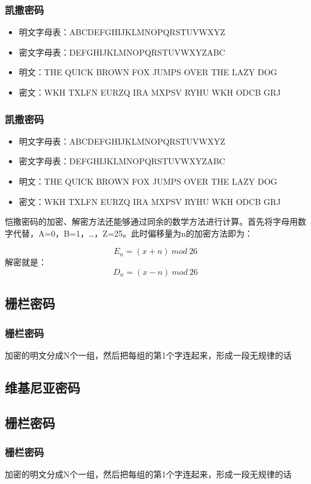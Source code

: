 \documentclass[slidestop,compress,mathserif]{beamer}
\begin{document}
\begin{frame}
  \frametitle{凯撒密码}
  \begin{itemize}[<+->]
    \item{明文字母表：}ABCDEFGHIJKLMNOPQRSTUVWXYZ
    \item{密文字母表：}DEFGHIJKLMNOPQRSTUVWXYZABC
    \item{明文：}THE QUICK BROWN FOX JUMPS OVER THE LAZY DOG
    \item{密文：}WKH TXLFN EURZQ IRA MXPSV RYHU WKH ODCB GRJ
    \end{itemize}

\end{frame}
\begin{frame}
  \frametitle{凯撒密码}
  \begin{itemize}
    \item{明文字母表：}ABCDEFGHIJKLMNOPQRSTUVWXYZ
    \item{密文字母表：}DEFGHIJKLMNOPQRSTUVWXYZABC
    \item{明文：}THE QUICK BROWN FOX JUMPS OVER THE LAZY DOG
    \item{密文：}WKH TXLFN EURZQ IRA MXPSV RYHU WKH ODCB GRJ
    \end{itemize}
  恺撒密码的加密、解密方法还能够通过同余的数学方法进行计算。首先将字母用数字代替，A=0，B=1，\ldots，Z=25。此时偏移量为n的加密方法即为：

  \begin{equation}
    E_n=(x+n) ~mod~ 26
  \end{equation}
  解密就是：
  \begin{equation}
    D_n=(x-n) ~mod~ 26
  \end{equation}

\end{frame}


\subsection{\hfill 栅栏密码}
\begin{frame}
  \frametitle{栅栏密码}
加密的明文分成N个一组，然后把每组的第1个字连起来，形成一段无规律的话
\end{frame}

\subsection{\hfill 维基尼亚密码}


\subsection{\hfill 栅栏密码}
\begin{frame}
  \frametitle{栅栏密码}
加密的明文分成N个一组，然后把每组的第1个字连起来，形成一段无规律的话
\end{frame}
\end{document}
